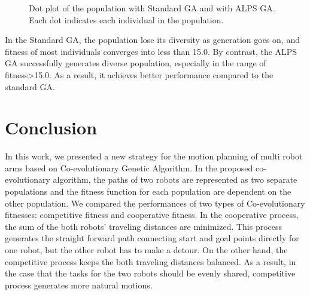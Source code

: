 \documentclass[12pt]{article} %
\begin{document}
\begin{figure}[H] %
\caption{Dot plot of the population with Standard GA and with ALPS GA. Each dot indicates each individual in the population.}
\label{fig:dotplot}
\end{figure}

In the Standard GA, the population lose its diversity as generation goes on, and fitness of most individuals converges into less than 15.0. By contrast, the ALPS GA successfully generates diverse population, especially in the range of fitness>15.0. As a result, it achieves better performance compared to the standard GA.



\section{Conclusion} %
In this work, we presented a new strategy for the motion planning of multi robot arms based on Co-evolutionary Genetic Algorithm. In the proposed co-evolutionary algorithm, the paths of two robots are represented as two separate populations and the fitness function for each population are dependent on the other population. We compared the performances of two types of Co-evolutionary fitnesses: competitive fitness and cooperative fitness. In the cooperative process, the sum of the both robots' traveling distances are minimized. This process generates the straight forward path connecting start and goal points directly for one robot, but the other robot has to make a detour. On the other hand, the competitive process keeps the both traveling distances balanced. As a result, in the case that the tasks for the two robots should be evenly shared, competitive process generates more natural motions.
 
\end{document}
